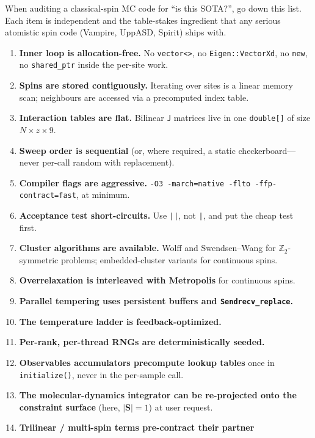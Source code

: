 \documentclass[11pt,letterpaper]{article}
\begin{document}
When auditing a classical-spin MC code for ``is this SOTA?'', go down
this list.  Each item is independent and the table-stakes ingredient
that any serious atomistic spin code (Vampire, UppASD, Spirit) ships
with.

\begin{enumerate}[itemsep=2pt]
  \item \textbf{Inner loop is allocation-free.}  No \texttt{vector<>},
        no \texttt{Eigen::VectorXd}, no \texttt{new}, no \texttt{shared\_ptr}
        inside the per-site work.
  \item \textbf{Spins are stored contiguously.}  Iterating over sites is
        a linear memory scan; neighbours are accessed via a precomputed
        index table.
  \item \textbf{Interaction tables are flat.}  Bilinear $\mathsf{J}$
        matrices live in one \texttt{double[]} of size $N \times z \times 9$.
  \item \textbf{Sweep order is sequential} (or, where required, a static
        checkerboard---never per-call random with replacement).
  \item \textbf{Compiler flags are aggressive.}  \texttt{-O3
        -march=native -flto -ffp-contract=fast}, at minimum.
  \item \textbf{Acceptance test short-circuits.}  Use \texttt{||}, not
        \texttt{|}, and put the cheap test first.
  \item \textbf{Cluster algorithms are available.}  Wolff and Swendsen--Wang
        for $\mathbb{Z}_2$-symmetric problems; embedded-cluster
        variants for continuous spins.
  \item \textbf{Overrelaxation is interleaved with Metropolis} for
        continuous spins.
  \item \textbf{Parallel tempering uses persistent buffers and
        \texttt{Sendrecv\_replace}.}
  \item \textbf{The temperature ladder is feedback-optimized.}
  \item \textbf{Per-rank, per-thread RNGs are deterministically seeded.}
  \item \textbf{Observables accumulators precompute lookup tables} once
        in \texttt{initialize()}, never in the per-sample call.
  \item \textbf{The molecular-dynamics integrator can be re-projected
        onto the constraint surface} (here, $|\mathbf{S}| = 1$) at user
        request.
  \item \textbf{Trilinear / multi-spin terms pre-contract their partner
}
\end{enumerate}
\end{document}

